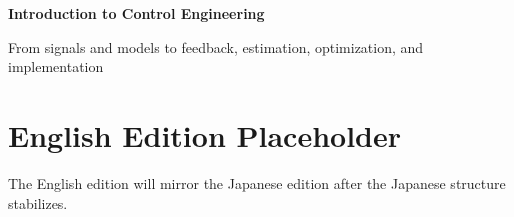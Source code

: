 \documentclass[a4paper,11pt,dvipdfmx]{ujarticle}
\begin{document}
\begin{center}
  {\Large\bfseries Introduction to Control Engineering}\par\vspace{2mm}
  {\normalsize From signals and models to feedback, estimation, optimization, and implementation}
\end{center}
\vspace{3mm}

\section*{English Edition Placeholder}

The English edition will mirror the Japanese edition after the Japanese structure stabilizes.
\end{document}
